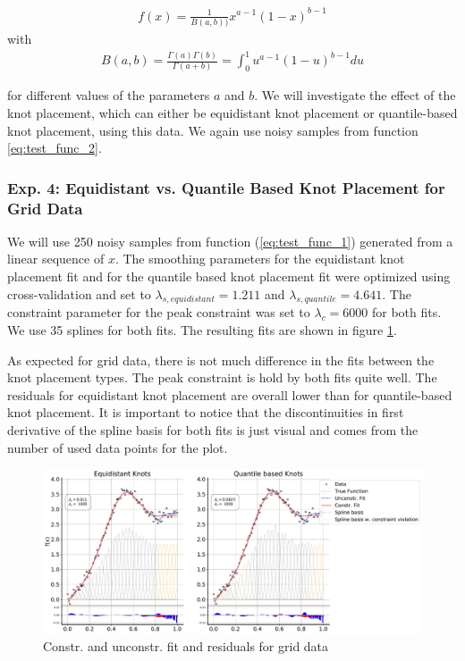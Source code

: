 \documentclass[10pt,a4paper]{article}
\begin{document}
\begin{align}
	f(x) = \frac{1}{B(a, b))} x^{a-1} (1-x)^{b-1} 
\end{align}
with
\begin{align*}
	B(a,b) = \frac{\Gamma(a)\Gamma(b)}{\Gamma(a+b)} = \int_0^1 u^{a-1} (1-u)^{b-1} du
\end{align*}


for different values of the parameters $a$ and $b$. We will investigate the effect of the knot placement, which can either be equidistant knot placement or quantile-based knot placement, using this data. We again use noisy samples from function \ref{eq:test_func_2}.

\subsubsection{Exp. 4: Equidistant vs. Quantile Based Knot Placement for Grid Data}

We will use 250 noisy samples from function (\ref{eq:test_func_1}) generated from a linear sequence of $x$. The smoothing parameters for the equidistant knot placement fit and for the quantile based knot placement fit were optimized using cross-validation and set to $\lambda_{s,equidistant} = 1.211$ and $\lambda_{s, quantile} = 4.641$. The constraint parameter for the peak constraint was set to $\lambda_c = 6000$ for both fits. We use 35 splines for both fits. The resulting fits are shown in figure \ref{fig:fit_grid_250}.

As expected for grid data, there is not much difference in the fits between the knot placement types. The peak constraint is hold by both fits quite well. The residuals for  equidistant knot placement are overall lower than for quantile-based knot placement. It is important to notice that the discontinuities in first derivative of the spline basis for both fits is just visual and comes from the number of used data points for the plot.


\begin{figure}[H]
	\centering
	\includegraphics[width=\columnwidth]{../thesisplots/exp_grid/exp_grid_ndata_250_rseed_1.pdf}
	\caption{Constr. and unconstr. fit and residuals for grid data}
	\label{fig:fit_grid_250}
\end{figure}
\end{document}
